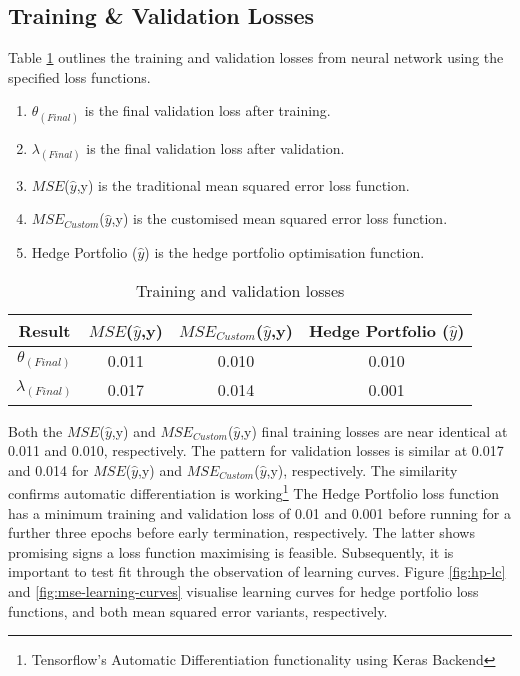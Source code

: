 \documentclass[12pt]{article}
\begin{document}
\subsection{Training \& Validation Losses}
Table \ref{train-val-losses} outlines the training and validation losses from neural network using the specified loss functions.
\begin{table}[H]
	\small
	\singlespacing
	\begin{enumerate}
		\item $\theta_{(Final)}$ is the final validation loss after training.
		\item $\lambda_{(Final)}$ is the final validation loss after validation.
		\item $MSE$($\hat{y}$,y) is the traditional mean squared error loss function.
		\item $MSE_{Custom}$($\hat{y}$,y) is the customised mean squared error loss function.
		\item Hedge Portfolio ($\hat{y}$) is the hedge portfolio optimisation function.
	\end{enumerate}
	\doublespacing
	\centering
	\begin{tabular}{||c||c||c||c||}
		\hline
		Result              & $MSE$($\hat{y}$,y) & $MSE_{Custom}$($\hat{y}$,y) & Hedge Portfolio ($\hat{y}$) \\ [0.5ex]
		\hline \hline
		$\theta_{(Final)}$  & 0.011              & 0.010                       & 0.010                       \\
		\hline
		$\lambda_{(Final)}$ & 0.017              & 0.014                       & 0.001                       \\
		\hline
	\end{tabular}
	\caption{Training and validation losses}
	\label{train-val-losses}
\end{table}
Both the $MSE$($\hat{y}$,y) and $MSE_{Custom}$($\hat{y}$,y) final training losses are near identical at 0.011 and 0.010, respectively.
The pattern for validation losses is similar at 0.017 and 0.014 for $MSE$($\hat{y}$,y) and $MSE_{Custom}$($\hat{y}$,y), respectively.
The similarity confirms automatic differentiation is working\footnote{Tensorflow's Automatic Differentiation functionality using Keras Backend}
The Hedge Portfolio loss function has a minimum training and validation loss of 0.01 and 0.001 before running for a further three epochs before early termination, respectively.
The latter shows promising signs a loss function maximising is feasible.
Subsequently, it is important to test fit through the observation of learning curves.
Figure \ref{fig:hp-lc} and \ref{fig:mse-learning-curves} visualise learning curves for hedge portfolio loss functions, and both mean squared error variants, respectively.
\end{document}

